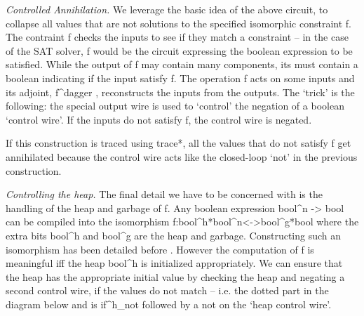 \documentclass[preprint]{sigplanconf}
\begin{document}
\emph{Controlled Annihilation.}
We leverage the basic idea of the above circuit, to collapse all
values that are not solutions to the specified isomorphic constraint
{{f}}. The contraint {{f}} checks the inputs to see if they match a
constraint -- in the case of the SAT solver, {{f}} would be the
circuit expressing the boolean expression to be satisfied.  While the
output of {{f}} may contain many components, its must contain a
boolean indicating if the input satisfy {{f}}. The operation {{f}}
acts on some inputs and its adjoint, {{f^{dagger} }}, reconstructs the
inputs from the outputs.  The `trick' is the following: the special
output wire is used to `control' the negation of a boolean `control
wire'.  If the inputs do not satisfy {{f}}, the control wire is
negated.

\begin{center}
\end{center}  

If this construction is traced using {{trace*}}, all the values that
do not satisfy {{f}} get annihilated because the control wire acts
like the closed-loop `not' in the previous construction. 

\emph{Controlling the heap.}  The final detail we have to be concerned
with is the handling of the heap and garbage of {{f}}. Any boolean
expression {{bool^n -> bool}} can be compiled into the isomorphism
{{f:bool^h*bool^n<->bool^g*bool}} where the extra bits {{bool^h}} and
{{bool^g}} are the heap and garbage. Constructing such an isomorphism
has been detailed before \cite{Toffoli:1980,infeffects}.  However the
computation of {{f}} is meaningful {{iff}} the heap {{bool^h}} is
initialized appropriately. We can ensure that the heap has the
appropriate initial value by checking the heap and negating a second
control wire, if the values do not match -- i.e. the dotted part in
the diagram below and is {{if^h_{not} }} followed by a {{not}} on the
`heap control wire'.

\begin{center}
\end{center}  
\end{document}
